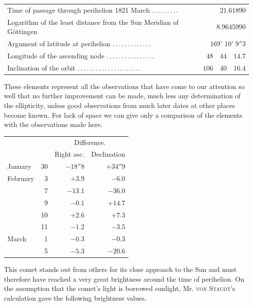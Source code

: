 \begin{center}
\small
\begin{tabular}{p{.73\linewidth}r}
Time of passage through perihelion 1821 March \mbox{.\,.\,.\,.\,.\,.\,.\,.\,.} & $21.61890$ \\
Logarithm of the least distance from the Sun Meridian of Göttingen & $8.9645990$ \\
Argument of latitude at perihelion \mbox{.\,.\,.\,.\,.\,.\,.\,.\,.\,.\,.\,.\,.} & $169^\circ\;10'\;9''3$ \\
Longitude of the ascending node \mbox{.\,.\,.\,.\,.\,.\,.\,.\,.\,.\,.\,.\,.\,.\,.\,.} & $48\quad44\quad14.7$ \\
Inclination of the orbit \mbox{.\,.\,.\,.\,.\,.\,.\,.\,.\,.\,.\,.\,.\,.\,.\,.\,.\,.\,.\,.\,.} & $106\quad40\quad16.4$ \\
\end{tabular}
\end{center}

These elements represent all the observations that have come to our attention so well that no further improvement can be made, much less any determination of the ellipticity, unless good observations from much later dates at other places become known. For lack of space we can give only a comparison of the elements with the observations made here.

\begin{center}
\begin{tabular}{lr|r|r}
& & \multicolumn{2}{c}{Difference.} \\
& & Right asc. & Declination \\
\hline
January & 30 & $-18''8$ & $+34''9$ \\
February & 3 & $+3.9$ & $-6.0$ \\
& 7 & $-13.1$ & $-36.0$ \\
& 9 & $-0.1$ & $+14.7$ \\
& 10 & $+2.6$ & $+7.3$ \\
& 11 & $-1.2$ & $-3.5$ \\
March & 1 & $-0.3$ & $-0.3$ \\
& 5 & $-5.3$ & $-20.6$ \\
\end{tabular}
\end{center}

This comet stands out from others for its close approach to the Sun and must therefore have reached a very great brightness around the time of perihelion. On the assumption that the comet’s light is borrowed sunlight, Mr. \textsc{von Staudt}’s calculation gave the following brightness values.

